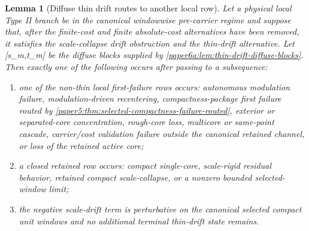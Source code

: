 \documentclass[11pt]{amsart}
\def\({}%
\def\){}%
\theoremstyle{plain}
\newtheorem{lemma}[lemma]{Lemma}
\theoremstyle{definition}
\theoremstyle{remark}
\begin{document}
\begin{lemma}[Diffuse thin drift routes to another local row]
\label{paper6a:lem:diffuse-thin-drift-routes}
Let a physical local Type II branch be in the canonical windowwise
pre-carrier regime and suppose that, after the finite-cost and finite
absolute-cost alternatives have been removed, it satisfies the scale-collapse
drift obstruction and the thin-drift alternative.  Let
\([s_m,t_m]\) be the diffuse blocks supplied by
\cref{paper6a:lem:thin-drift-diffuse-blocks}.  Then exactly one of the
following occurs after passing to a subsequence:
\begin{enumerate}[label=\textup{(T\arabic*)}]
\item one of the non-thin local first-failure rows occurs: autonomous
      modulation failure, modulation-driven recentering, compactness-package
      first failure routed by
      \cref{paper5:thm:selected-compactness-failure-routed}, exterior or
      separated-core concentration, rough-core loss, multicore or same-point
      cascade, carrier/cost validation failure outside the canonical retained
      channel, or loss of the retained active core;
\item a closed retained row occurs: compact single-core, scale-rigid residual
      behavior, retained compact scale-collapse, or a nonzero bounded
      selected-window limit;
\item the negative scale-drift term is perturbative on the canonical selected
      compact unit windows and no additional terminal thin-drift state remains.
\end{enumerate}
\end{lemma}
\end{document}
